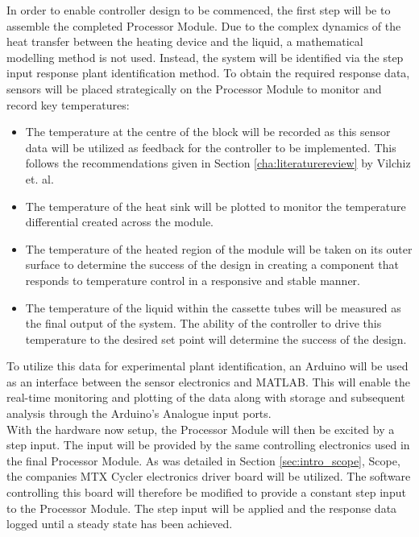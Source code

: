 In order to enable controller design to be commenced, the first step will be to assemble the completed Processor Module. Due to the complex dynamics of the heat transfer between the heating device and the liquid, a mathematical modelling method is not used. Instead, the system will be identified via the step input response plant identification method. To obtain the required response data, sensors will be placed strategically on the Processor Module to monitor and record key temperatures:
\begin{itemize}
	\item The temperature at the centre of the block will be recorded as this sensor data will be utilized as feedback for the controller to be implemented. This follows the recommendations given in Section \ref{cha:literaturereview} by Vilchiz et. al.
	\item The temperature of the heat sink will be plotted to monitor the temperature differential created across the module.
	\item The temperature of the heated region of the module will be taken on its outer surface to determine the success of the design in creating a component that responds to temperature control in a responsive and stable manner.
	\item The temperature of the liquid within the cassette tubes will be measured as the final output of the system. The ability of the controller to drive this temperature to the desired set point will determine the success of the design.
\end{itemize}

To utilize this data for experimental plant identification, an Arduino will be used as an interface between the sensor electronics and MATLAB. This will enable the real-time monitoring and plotting of the data along with storage and subsequent analysis through the Arduino's Analogue input ports.\\

With the hardware now setup, the Processor Module will then be excited by a step input. The input will be provided by the same controlling electronics used in the final Processor Module. As was detailed in Section \ref{sec:intro_scope}, Scope, the companies MTX Cycler electronics driver board will be utilized. The software controlling this board will therefore be modified to provide a constant step input to the Processor Module. The step input will be applied and the response data logged until a steady state has been achieved.\\


